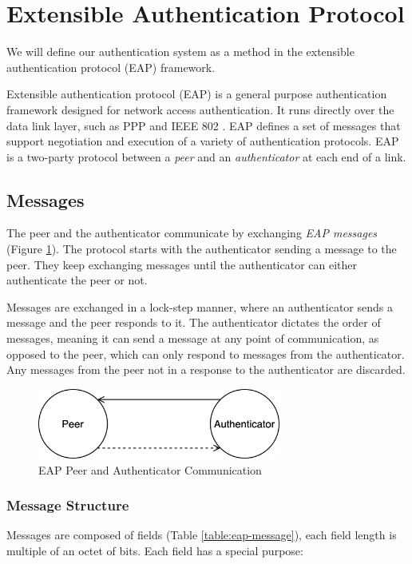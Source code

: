\section{Extensible Authentication Protocol}
\label{section:eap}
We will define our authentication system as a method in the extensible authentication protocol (EAP) framework.

Extensible authentication protocol \cite{aboba2004extensible} (EAP) is a general purpose authentication framework designed for network access authentication. 
It runs directly over the data link layer, such as PPP \cite{simpson1994rfc1661} and IEEE 802 \cite{10.5555/18422.18423}.
EAP defines a set of messages that support negotiation and execution of a variety of authentication protocols.
EAP is a two-party protocol between a \textit{peer} and an \textit{authenticator} at each end of a link.  

\subsection{Messages}
The peer and the authenticator communicate by exchanging \textit{EAP messages} (Figure \ref{fig:eap-messages}).
The protocol starts with the authenticator sending a message to the peer. They keep exchanging messages until the authenticator can either authenticate the peer or not.

Messages are exchanged in a lock-step manner, where an authenticator sends a message and the peer responds to it. 
The authenticator dictates the order of messages, meaning it can send a message at any point of communication, as opposed to the peer, which can only respond to messages from the authenticator.
Any messages from the peer not in a response to the authenticator are discarded.
\bigskip
\begin{figure}[h]
	\centering
	\includegraphics[width=8cm]{images/eap-messages}
	\caption{EAP Peer and Authenticator Communication}
	\label{fig:eap-messages}
\end{figure}

\subsubsection{Message Structure}
Messages are composed of fields (Table \ref{table:eap-message}), each field length is multiple of an octet of bits.
Each field has a special purpose:

